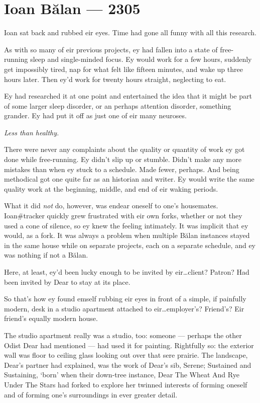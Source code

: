 \hypertarget{ioan-bux103lan-2305}{%
\chapter*{Ioan Bălan — 2305}\label{ioan-bux103lan-2305}}

Ioan sat back and rubbed eir eyes. Time had gone all funny with all this research.

As with so many of eir previous projects, ey had fallen into a state of free-running sleep and single-minded focus. Ey would work for a few hours, suddenly get impossibly tired, nap for what felt like fifteen minutes, and wake up three hours later. Then ey'd work for twenty hours straight, neglecting to eat.

Ey had researched it at one point and entertained the idea that it might be part of some larger sleep disorder, or an perhaps attention disorder, something grander. Ey had put it off as just one of eir many neuroses.

\emph{Less than healthy.}

There were never any complaints about the quality or quantity of work ey got done while free-running. Ey didn't slip up or stumble. Didn't make any more mistakes than when ey stuck to a schedule. Made fewer, perhaps. And being methodical got one quite far as an historian and writer. Ey would write the same quality work at the beginning, middle, and end of eir waking periods.

What it did \emph{not} do, however, was endear oneself to one's housemates. Ioan\#tracker quickly grew frustrated with eir own forks, whether or not they used a cone of silence, so ey knew the feeling intimately. It was implicit that ey would, as a fork. It was always a problem when multiple Bălan instances stayed in the same house while on separate projects, each on a separate schedule, and ey was nothing if not a Bălan.

Here, at least, ey'd been lucky enough to be invited by eir\ldots{}client? Patron? Had been invited by Dear to stay at its place.

So that's how ey found emself rubbing eir eyes in front of a simple, if painfully modern, desk in a studio apartment attached to eir\ldots{}employer's? Friend's? Eir friend's equally modern house.

The studio apartment really was a studio, too: someone — perhaps the other Odist Dear had mentioned — had used it for painting. Rightfully so: the exterior wall was floor to ceiling glass looking out over that sere prairie. The landscape, Dear's partner had explained, was the work of Dear's sib, Serene; Sustained and Sustaining, `born' when their down-tree instance, Dear The Wheat And Rye Under The Stars had forked to explore her twinned interests of forming oneself and of forming one's surroundings in ever greater detail.


